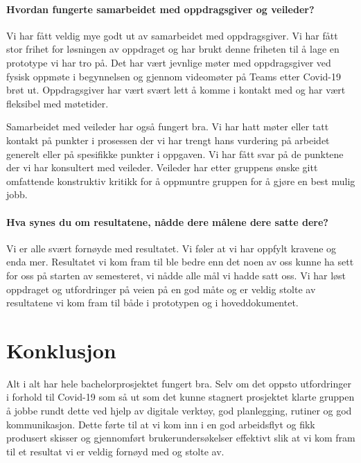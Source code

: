 \documentclass[11pt,a4paper]{report}
\begin{document}
\paragraph{Hvordan fungerte samarbeidet med oppdragsgiver og veileder?}
Vi har fått veldig mye godt ut av samarbeidet med oppdragsgiver. Vi har fått stor frihet for løsningen av oppdraget og har brukt denne friheten til å lage en prototype vi har tro på. Det har vært jevnlige møter med oppdragsgiver ved fysisk oppmøte i begynnelsen og gjennom videomøter på Teams etter Covid-19 brøt ut. Oppdragsgiver har vært svært lett å komme i kontakt med og har vært fleksibel med møtetider.

Samarbeidet med veileder har også fungert bra. Vi har hatt møter eller tatt kontakt på punkter i prosessen der vi har trengt hans vurdering på arbeidet generelt eller på spesifikke punkter i oppgaven. Vi har fått svar på de punktene der vi har konsultert med veileder. Veileder har etter gruppens ønske gitt omfattende konstruktiv kritikk for å oppmuntre gruppen for å gjøre en best mulig jobb. 
    
\paragraph{Hva synes du om resultatene, nådde dere målene dere satte dere?}
Vi er alle svært fornøyde med resultatet. Vi føler at vi har oppfylt kravene og enda mer. Resultatet vi kom fram til ble bedre enn det noen av oss kunne ha sett for oss på starten av semesteret, vi nådde alle mål vi hadde satt oss. Vi har løst oppdraget og utfordringer på veien på en god måte og er veldig stolte av resultatene vi kom fram til både i prototypen og i hoveddokumentet.
 

\section*{Konklusjon}
Alt i alt har hele bachelorprosjektet fungert bra. Selv om det oppsto utfordringer i forhold til Covid-19 som så ut som det kunne stagnert prosjektet klarte gruppen å jobbe rundt dette ved hjelp av digitale verktøy, god planlegging, rutiner og god kommunikasjon. Dette førte til at vi kom inn i en god arbeidsflyt og fikk produsert skisser og gjennomført brukerundersøkelser effektivt slik at vi kom fram til et resultat vi er veldig fornøyd med og stolte av.
\end{document}
